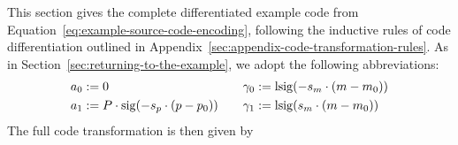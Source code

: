 \documentclass[11pt,a4paper]{article}
\theoremstyle{definition}
\theoremstyle{remark}
\begin{document}
This section gives the complete differentiated example code from Equation~\eqref{eq:example-source-code-encoding}, following the inductive rules of code differentiation outlined in Appendix~\ref{sec:appendix-code-transformation-rules}. As in Section~\ref{sec:returning-to-the-example}, we adopt the following abbreviations:
\begin{equation*}
  \begin{aligned}
    a_{0} &:= 0
    \\
    a_{1} &:= P \cdot \fn[n]{ \opn[b]{sig} }{ -s_{p} \cdot \left( p - p_{0} \right) }
  \end{aligned}
  \qquad
  \begin{aligned}
    \gamma_{0} &:= \fn[n]{ \opn[b]{lsig} }{ -s_{m} \cdot \left( m - m_{0} \right) }
    \\
    \gamma_{1} &:= \fn[n]{ \opn[b]{lsig} }{ s_{m} \cdot \left( m - m_{0} \right) }
  \end{aligned}
\end{equation*}
The full code transformation is then given by
\end{document}
